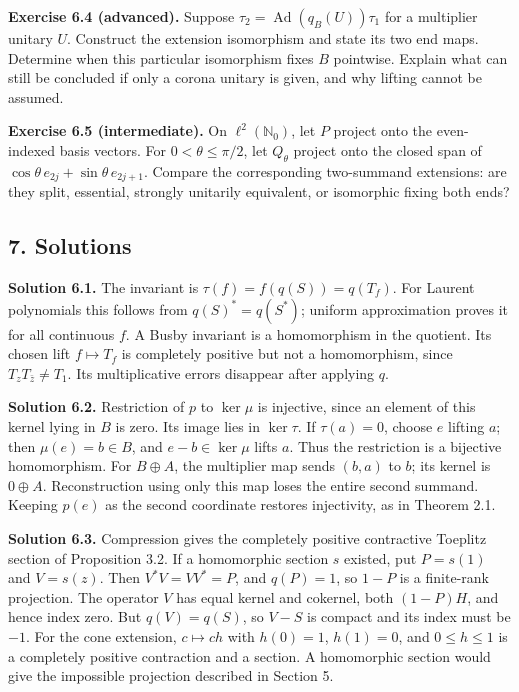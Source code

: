 \documentclass[
  11pt,
]{article}
\begin{document}
\textbf{Exercise 6.4 (advanced).} Suppose
\(\tau_2=\operatorname{Ad}(q_B(U))\tau_1\) for a multiplier unitary
\(U\). Construct the extension isomorphism and state its two end maps.
Determine when this particular isomorphism fixes \(B\) pointwise.
Explain what can still be concluded if only a corona unitary is given,
and why lifting cannot be assumed.

\textbf{Exercise 6.5 (intermediate).} On \(\ell^2(\mathbb N_0)\), let
\(P\) project onto the even-indexed basis vectors. For
\(0<\theta\leq\pi/2\), let \(Q_\theta\) project onto the closed span of
\(\cos\theta\,e_{2j}+\sin\theta\,e_{2j+1}\). Compare the corresponding
two-summand extensions: are they split, essential, strongly unitarily
equivalent, or isomorphic fixing both ends?

\subsection{7. Solutions}\label{solutions}

\textbf{Solution 6.1.} The invariant is \(\tau(f)=f(q(S))=q(T_f)\). For
Laurent polynomials this follows from \(q(S)^*=q(S^*)\); uniform
approximation proves it for all continuous \(f\). A Busby invariant is a
homomorphism in the quotient. Its chosen lift \(f\mapsto T_f\) is
completely positive but not a homomorphism, since
\(T_zT_{\bar z}\ne T_1\). Its multiplicative errors disappear after
applying \(q\).

\textbf{Solution 6.2.} Restriction of \(p\) to \(\ker\mu\) is injective,
since an element of this kernel lying in \(B\) is zero. Its image lies
in \(\ker\tau\). If \(\tau(a)=0\), choose \(e\) lifting \(a\); then
\(\mu(e)=b\in B\), and \(e-b\in\ker\mu\) lifts \(a\). Thus the
restriction is a bijective homomorphism. For \(B\oplus A\), the
multiplier map sends \((b,a)\) to \(b\); its kernel is \(0\oplus A\).
Reconstruction using only this map loses the entire second summand.
Keeping \(p(e)\) as the second coordinate restores injectivity, as in
Theorem 2.1.

\textbf{Solution 6.3.} Compression gives the completely positive
contractive Toeplitz section of Proposition 3.2. If a homomorphic
section \(s\) existed, put \(P=s(1)\) and \(V=s(z)\). Then
\(V^*V=VV^*=P\), and \(q(P)=1\), so \(1-P\) is a finite-rank projection.
The operator \(V\) has equal kernel and cokernel, both \((1-P)H\), and
hence index zero. But \(q(V)=q(S)\), so \(V-S\) is compact and its index
must be \(-1\). For the cone extension, \(c\mapsto ch\) with \(h(0)=1\),
\(h(1)=0\), and \(0\leq h\leq1\) is a completely positive contraction
and a section. A homomorphic section would give the impossible
projection described in Section 5.
\end{document}
